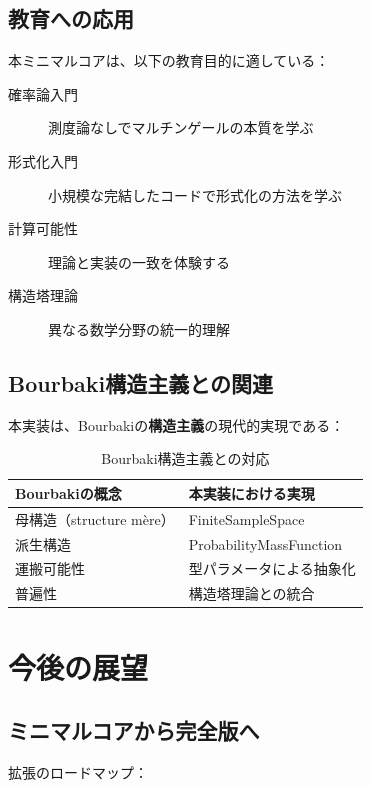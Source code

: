 \documentclass[a4paper,12pt]{ltjsarticle}
\theoremstyle{definition}
\begin{document}
\subsection{教育への応用}

本ミニマルコアは、以下の教育目的に適している：

\begin{description}
\item[確率論入門] 測度論なしでマルチンゲールの本質を学ぶ
\item[形式化入門] 小規模な完結したコードで形式化の方法を学ぶ
\item[計算可能性] 理論と実装の一致を体験する
\item[構造塔理論] 異なる数学分野の統一的理解
\end{description}

\subsection{Bourbaki構造主義との関連}

本実装は、Bourbakiの\textbf{構造主義}の現代的実現である：

\begin{table}[h]
\centering
\caption{Bourbaki構造主義との対応}
\begin{tabular}{ll}
\hline
Bourbakiの概念 & 本実装における実現 \\
\hline
母構造（structure mère） & FiniteSampleSpace \\
派生構造 & ProbabilityMassFunction \\
運搬可能性 & 型パラメータによる抽象化 \\
普遍性 & 構造塔理論との統合 \\
\hline
\end{tabular}
\end{table}

\section{今後の展望}

\subsection{ミニマルコアから完全版へ}

拡張のロードマップ：
\end{document}
